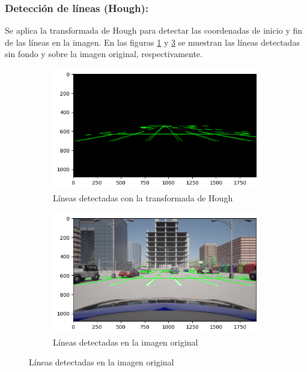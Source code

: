 \subsubsection{Detección de líneas (Hough):}
\noindent
Se aplica la transformada de Hough \cite{ballard1981hough} para detectar las coordenadas de inicio y fin de las líneas en la imagen.
En las figuras \ref{fig:hough} y \ref{fig:lines} se muestran las líneas detectadas sin fondo y sobre la imagen original, respectivamente.
\begin{figure}[!ht]
    \begin{subfigure}{0.5\textwidth}
        \includegraphics[width=\textwidth]{img/reticule/hough2}
        \caption{Líneas detectadas con la transformada de Hough}
        \label{fig:hough}
    \end{subfigure}
    \begin{subfigure}{0.5\textwidth}
        \includegraphics[width=\textwidth]{img/reticule/hough}
        \caption{Líneas detectadas en la imagen original}
        \label{fig:lines}
    \end{subfigure}
\end{figure}

